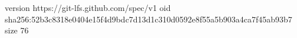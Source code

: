 version https://git-lfs.github.com/spec/v1
oid sha256:52b3c8318e0404e15f4d9bdc7d13d1c310d0592e8f55a5b903a4ca7f45ab93b7
size 76
